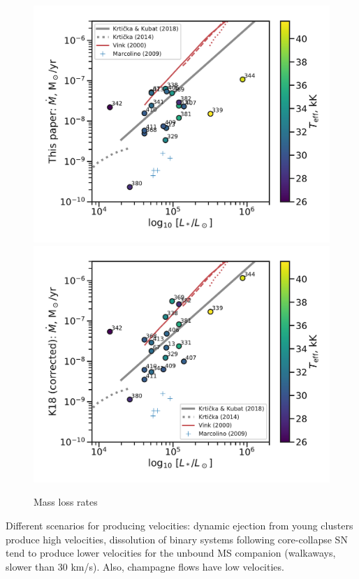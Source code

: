 \begin{figure}
  \centering
  \includegraphics[width=\linewidth]{figs/Mdot-from-eta-vs-luminosity}
  \includegraphics[width=\linewidth]{figs/Mdot-K18-corrected-vs-luminosity}
  \caption{Mass loss rates}
  \label{fig:mass-loss-vs-luminosity}
\end{figure}



Different scenarios for producing velocities: dynamic ejection from
young clusters \citep{Hoogerwerf:2001a, Oh:2016c} produce high
velocities, dissolution of binary systems following core-collapse SN
\citep{Renzo:2018a} tend to produce lower velocities for the unbound
MS companion (walkaways, slower than 30 km/s).  Also, champagne flows
have low velocities.

